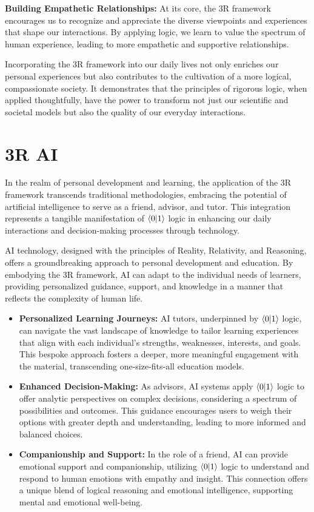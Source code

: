 \documentclass[12pt]{article}
\begin{document}
\textbf{Building Empathetic Relationships:} At its core, the 3R framework encourages us to recognize and appreciate the diverse viewpoints and experiences that shape our interactions. By applying \qbit{} logic, we learn to value the spectrum of human experience, leading to more empathetic and supportive relationships.

Incorporating the 3R framework into our daily lives not only enriches our personal experiences but also contributes to the cultivation of a more logical, compassionate society. It demonstrates that the principles of rigorous logic, when applied thoughtfully, have the power to transform not just our scientific and societal models but also the quality of our everyday interactions.

\section*{3R AI}

In the realm of personal development and learning, the application of the 3R framework transcends traditional methodologies, embracing the potential of artificial intelligence to serve as a friend, advisor, and tutor. This integration represents a tangible manifestation of \(\langle 0 | 1 \rangle\) logic in enhancing our daily interactions and decision-making processes through technology.

AI technology, designed with the principles of Reality, Relativity, and Reasoning, offers a groundbreaking approach to personal development and education. By embodying the 3R framework, AI can adapt to the individual needs of learners, providing personalized guidance, support, and knowledge in a manner that reflects the complexity of human life.

\begin{itemize}
    \item \textbf{Personalized Learning Journeys:} AI tutors, underpinned by \(\langle 0 | 1 \rangle\) logic, can navigate the vast landscape of knowledge to tailor learning experiences that align with each individual's strengths, weaknesses, interests, and goals. This bespoke approach fosters a deeper, more meaningful engagement with the material, transcending one-size-fits-all education models.
    \item \textbf{Enhanced Decision-Making:} As advisors, AI systems apply \(\langle 0 | 1 \rangle\) logic to offer analytic perspectives on complex decisions, considering a spectrum of possibilities and outcomes. This guidance encourages users to weigh their options with greater depth and understanding, leading to more informed and balanced choices.
    \item \textbf{Companionship and Support:} In the role of a friend, AI can provide emotional support and companionship, utilizing \(\langle 0 | 1 \rangle\) logic to understand and respond to human emotions with empathy and insight. This connection offers a unique blend of logical reasoning and emotional intelligence, supporting mental and emotional well-being.
\end{itemize}
\end{document}
